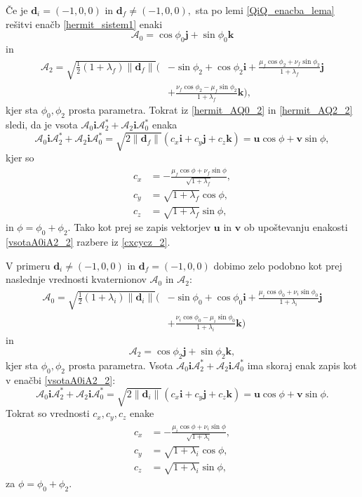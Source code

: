 \documentclass[12pt,a4paper,twoside]{article}
\theoremstyle{definition} %
\theoremstyle{plain} %
\theoremstyle{primerstyle}
\numberwithin{equation}{section}  %
\newcommand{\dV}{\mathbf{d}}
\newcommand{\iV}{\mathbf{i}}
\newcommand{\jV}{\mathbf{j}}
\newcommand{\kV}{\mathbf{k}}
\newcommand{\uV}{\mathbf{u}}
\newcommand{\vV}{\mathbf{v}}
\newcommand{\AQ}{\mathcal{A}}
\begin{document}
Če je $\dV_i=(-1,0,0)$ in $\dV_f\neq(-1,0,0),$ sta po lemi \ref{QiQ_enacba_lema} rešitvi enačb \eqref{hermit_sistem1} enaki
\begin{equation}
	\label{hermit_AQ0_2}
	\AQ_0=\cos\phi_0\jV+\sin\phi_0\kV
\end{equation}
in
\begin{align}
	\label{hermit_AQ2_2}
	\AQ_2=\sqrt{\frac{1}{2}(1+\lambda_f)\lVert\dV_f\rVert}\Big(&-\sin\phi_2+\cos\phi_2\iV+\frac{\mu_f\cos\phi_2+\nu_f\sin\phi_2}{1+\lambda_f}\jV\nonumber\\
		&+\frac{\nu_f\cos\phi_2-\mu_f\sin\phi_2}{1+\lambda_f}\kV\Big),
\end{align}
kjer sta $\phi_0,\phi_2$ prosta parametra. Tokrat iz \eqref{hermit_AQ0_2} in \eqref{hermit_AQ2_2} sledi, da je vsota $\AQ_0\iV\AQ_2^*+\AQ_2\iV\AQ_0^*$ enaka
\begin{equation}
	\label{vsotaA0iA2_2}
	\AQ_0\iV\AQ_2^*+\AQ_2\iV\AQ_0^*=\sqrt{2\lVert\dV_f\rVert}(c_x\iV+c_y\jV+c_z\kV)=\uV\cos\phi+\vV\sin\phi,
\end{equation}
kjer so
\begin{align}
	\label{cxcycz_2}
	c_x&=-\frac{\mu_f\cos\phi+\nu_f\sin\phi}{\sqrt{1+\lambda_f}},\nonumber\\
	c_y&=\sqrt{1+\lambda_f}\cos\phi,\\
	c_z&=\sqrt{1+\lambda_f}\sin\phi,\nonumber
\end{align}
in $\phi=\phi_0+\phi_2.$ Tako kot prej se zapis vektorjev $\uV$ in $\vV$ ob upoštevanju enakosti \eqref{vsotaA0iA2_2} razbere iz \eqref{cxcycz_2}.

V primeru $\dV_i\neq(-1,0,0)$ in $\dV_f=(-1,0,0)$ dobimo zelo podobno kot prej naslednje vrednosti kvaternionov $\AQ_0$ in $\AQ_2$:
\begin{align}
	\label{hermit_AQ0_3}
	\AQ_0=\sqrt{\frac{1}{2}(1+\lambda_i)\lVert\dV_i\rVert}\Big(&-\sin\phi_0+\cos\phi_0\iV+\frac{\mu_i\cos\phi_0+\nu_i\sin\phi_0}{1+\lambda_i}\jV\nonumber\\
		&+\frac{\nu_i\cos\phi_0-\mu_i\sin\phi_0}{1+\lambda_i}\kV\Big)
\end{align}
in
\begin{equation}
	\label{hermit_AQ2_3}
	\AQ_2=\cos\phi_2\jV+\sin\phi_2\kV,
\end{equation}
kjer sta $\phi_0,\phi_2$ prosta parametra. Vsota $\AQ_0\iV\AQ_2^*+\AQ_2\iV\AQ_0^*$ ima skoraj enak zapis kot v enačbi \eqref{vsotaA0iA2_2}:
\begin{equation}
	\label{vsotaA0iA2_3}
	\AQ_0\iV\AQ_2^*+\AQ_2\iV\AQ_0^*=\sqrt{2\lVert\dV_i\rVert}(c_x\iV+c_y\jV+c_z\kV)=\uV\cos\phi+\vV\sin\phi.
\end{equation}
Tokrat so vrednosti $c_x,c_y,c_z$ enake
\begin{align}
	\label{cxcycz_3}
	c_x&=-\frac{\mu_i\cos\phi+\nu_i\sin\phi}{\sqrt{1+\lambda_i}},\nonumber\\
	c_y&=\sqrt{1+\lambda_i}\cos\phi,\\
	c_z&=\sqrt{1+\lambda_i}\sin\phi,\nonumber
\end{align}
za $\phi=\phi_0+\phi_2.$
\end{document}
